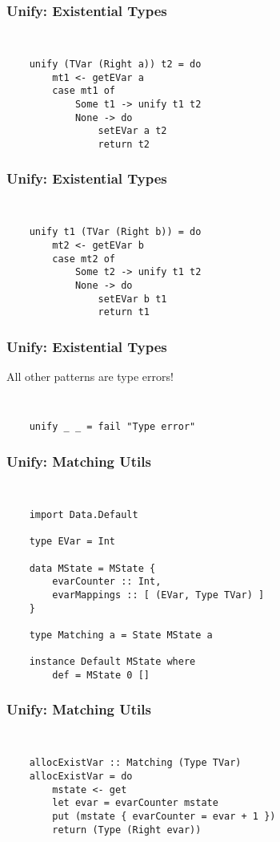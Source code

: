 \documentclass{beamer}
\begin{document}
\begin{frame}[fragile]
\frametitle{Unify: Existential Types}
\large{
{\tt
\begin{verbatim}
    unify (TVar (Right a)) t2 = do
        mt1 <- getEVar a
        case mt1 of
            Some t1 -> unify t1 t2
            None -> do
                setEVar a t2
                return t2
\end{verbatim}
}}
\end{frame}

\begin{frame}[fragile]
\frametitle{Unify: Existential Types}
\large{
{\tt
\begin{verbatim}
    unify t1 (TVar (Right b)) = do
        mt2 <- getEVar b
        case mt2 of
            Some t2 -> unify t1 t2
            None -> do
                setEVar b t1
                return t1
\end{verbatim}
}}
\end{frame}

\begin{frame}[fragile]
\frametitle{Unify: Existential Types}
\large{
\begin{center}
\alert{All} other patterns are type errors!
\end{center}

{\tt
\begin{verbatim}
    unify _ _ = fail "Type error"
\end{verbatim}
}}
\end{frame}

\begin{frame}[fragile]
\frametitle{Unify: Matching Utils}
\large{
{\tt
\begin{verbatim}
    import Data.Default

    type EVar = Int

    data MState = MState {
        evarCounter :: Int,
        evarMappings :: [ (EVar, Type TVar) ]
    }

    type Matching a = State MState a

    instance Default MState where
        def = MState 0 []
\end{verbatim}
}}
\end{frame}

\begin{frame}[fragile]
\frametitle{Unify: Matching Utils}
\large{
{\tt
\begin{verbatim}
    allocExistVar :: Matching (Type TVar)
    allocExistVar = do
        mstate <- get
        let evar = evarCounter mstate
        put (mstate { evarCounter = evar + 1 })
        return (Type (Right evar))
\end{verbatim}
}}
\end{frame}
\end{document}
